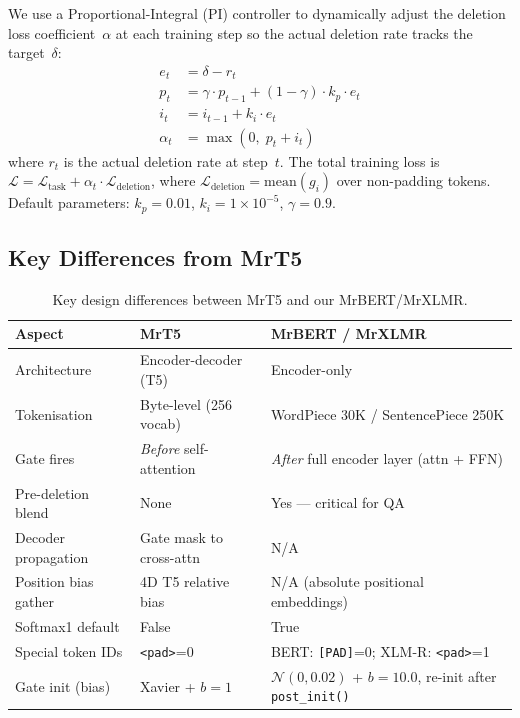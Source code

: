 \documentclass[11pt,a4paper]{article}
\begin{document}
We use a Proportional-Integral (PI) controller to dynamically adjust the deletion loss coefficient~$\alpha$ at each training step so the actual deletion rate tracks the target~$\delta$:
\begin{align}
    e_t &= \delta - r_t \label{eq:pi-error} \\
    p_t &= \gamma \cdot p_{t-1} + (1 - \gamma) \cdot k_p \cdot e_t \label{eq:pi-p} \\
    i_t &= i_{t-1} + k_i \cdot e_t \label{eq:pi-i} \\
    \alpha_t &= \max(0,\; p_t + i_t) \label{eq:pi-alpha}
\end{align}
where $r_t$ is the actual deletion rate at step~$t$. The total training loss is $\mathcal{L} = \mathcal{L}_{\text{task}} + \alpha_t \cdot \mathcal{L}_{\text{deletion}}$, where $\mathcal{L}_{\text{deletion}} = \text{mean}(g_i)$ over non-padding tokens. Default parameters: $k_p = 0.01$, $k_i = 1 \times 10^{-5}$, $\gamma = 0.9$.


\subsection{Key Differences from MrT5}
\label{sec:diff-mrt5}

\begin{table}[h]
\centering
\small
\begin{tabular}{@{}lll@{}}
\toprule
\textbf{Aspect} & \textbf{MrT5} & \textbf{MrBERT / MrXLMR} \\
\midrule
Architecture           & Encoder-decoder (T5)         & Encoder-only \\
Tokenisation           & Byte-level (256 vocab)       & WordPiece 30K / SentencePiece 250K \\
Gate fires             & \emph{Before} self-attention  & \emph{After} full encoder layer (attn + FFN) \\
Pre-deletion blend     & None                         & Yes --- critical for QA \\
Decoder propagation    & Gate mask to cross-attn      & N/A \\
Position bias gather   & 4D T5 relative bias          & N/A (absolute positional embeddings) \\
Softmax1 default       & False                        & True \\
Special token IDs      & \texttt{<pad>}=0             & BERT: \texttt{[PAD]}=0; XLM-R: \texttt{<pad>}=1 \\
Gate init (bias)       & Xavier + $b=1$               & $\mathcal{N}(0,0.02)$ + $b=10.0$, re-init after \texttt{post\_init()} \\
\bottomrule
\end{tabular}
\caption{Key design differences between MrT5 and our MrBERT/MrXLMR.}
\label{tab:diff-mrt5}
\end{table}
\end{document}
